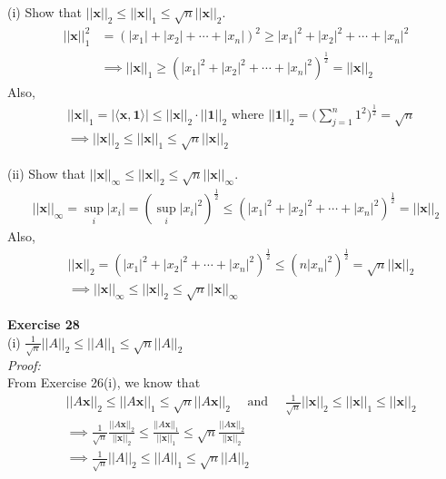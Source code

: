 \documentclass[letterpaper,12pt]{article}
\let\vec\mathbf
\theoremstyle{definition}
\begin{document}
(i) Show that $||\vec{x}||_2 \leq ||\vec{x}||_1 \leq \sqrt{n} ||\vec{x}||_2$. \\
\begin{align*}
  ||\vec{x}||_1^2 &= (|x_1| + |x_2| + \cdots + |x_n|)^2 \geq |x_1|^2 + |x_2|^2 + \cdots + |x_n|^2 \\
  & \implies ||\vec{x}||_1 \geq (|x_1|^2 + |x_2|^2 + \cdots + |x_n|^2)^\frac{1}{2} = ||\vec{x}||_2
\end{align*}
Also,
\begin{align*}
  &||\vec{x}||_1 = |\langle \vec{x}, \vec{1} \rangle| \leq ||\vec{x}||_2 \cdot ||\vec{1}||_2 \text{ where } ||\vec{1}||_2 = \Big(\sum_{j=1}^n 1^2\Big)^\frac{1}{2} = \sqrt{n} \\
  & \implies ||\vec{x}||_2 \leq ||\vec{x}||_1 \leq \sqrt{n} ||\vec{x}||_2
\end{align*}

(ii) Show that $||\vec{x}||_\infty \leq ||\vec{x}||_2 \leq \sqrt{n} ||\vec{x}||_\infty$. \\
\begin{align*}
  ||\vec{x}||_\infty = \sup_i{|x_i|} = (\sup_i{|x_i|^2})^\frac{1}{2} \leq (|x_1|^2 + |x_2|^2 + \cdots + |x_n|^2)^\frac{1}{2} = ||\vec{x}||_2
\end{align*}
Also,
\begin{align*}
  &||\vec{x}||_2 = (|x_1|^2 + |x_2|^2 + \cdots + |x_n|^2)^\frac{1}{2} \leq (n |x_n|^2)^\frac{1}{2} = \sqrt{n} ||\vec{x}||_2 \\
  & \implies ||\vec{x}||_\infty \leq ||\vec{x}||_2 \leq \sqrt{n} ||\vec{x}||_\infty
\end{align*}

\textbf{Exercise 28} \\
(i) $\frac{1}{\sqrt{n}} ||A||_2 \leq ||A||_1 \leq \sqrt{n} ||A||_2$ \\
\textit{Proof:} \\
From Exercise 26(i), we know that
\begin{align*}
  &||A\vec{x}||_2 \leq ||A\vec{x}||_1 \leq \sqrt{n} ||A\vec{x}||_2 \quad \text{ and } \quad \frac{1}{\sqrt{n}} ||\vec{x}||_2 \leq ||\vec{x}||_1 \leq ||\vec{x}||_2 \\
  & \implies \frac{1}{\sqrt{n}} \frac{||A\vec{x}||_2}{||\vec{x}||_2} \leq \frac{||A\vec{x}||_1}{||\vec{x}||_1} \leq \sqrt{n} \frac{||A\vec{x}||_2}{||\vec{x}||_2} \\
  & \implies \frac{1}{\sqrt{n}} ||A||_2 \leq ||A||_1 \leq \sqrt{n} ||A||_2
\end{align*}
\end{document}
